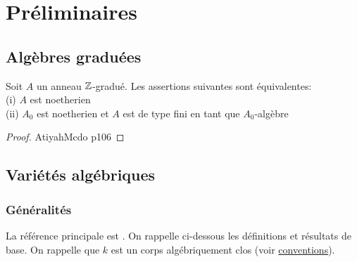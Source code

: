 \chapter{Préliminaires}

\section{Algèbres graduées}

\begin{prop}\label{noethgrad}
Soit $A$ un anneau $\mathbb{Z}$-gradué. Les assertions suivantes sont équivalentes:\\
(i) $A$ est noetherien\\
(ii) $A_0$ est noetherien et $A$ est de type fini en tant que $A_0$-algèbre
\end{prop}
\begin{proof}
AtiyahMcdo p106
\end{proof}


\section{Variétés algébriques}

\subsection{Généralités}
La référence principale est \cite{LAGSpringer}. On rappelle ci-dessous les définitions et résultats de base. On rappelle que $k$ est un corps algébriquement clos (voir \hyperref[sec:conventions]{conventions}).
